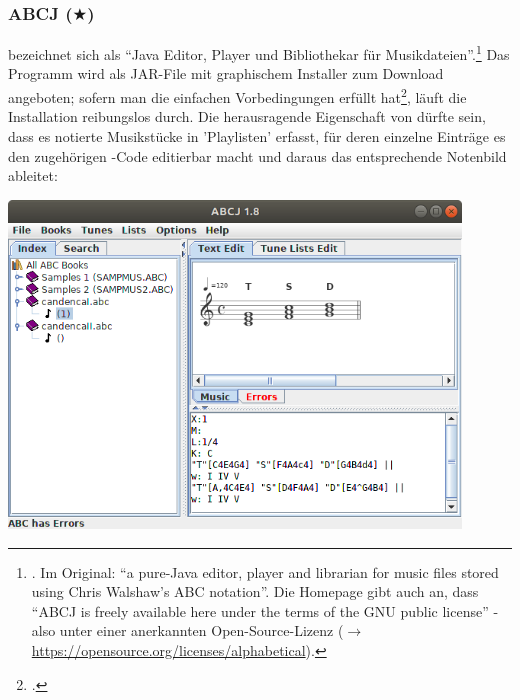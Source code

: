 %
%
%



\subsubsection{ABCJ ($\bigstar$)}

\label{ABCJ} bezeichnet sich als \enquote{Java Editor, Player und
Bibliothekar für Musikdateien}.\footnote{\cite[vgl.][\nopage wp]{Spencer2019a}.
Im Original: \enquote{a pure-Java editor, player and librarian for music files
stored using Chris Walshaw's ABC notation}. Die Homepage gibt auch an, dass
\enquote{ABCJ is freely available here under the terms of the GNU public
license} - also unter einer anerkannten Open-Source-Lizenz ($\rightarrow$
\href{https://opensource.org/licenses/alphabetical}
{https://opensource.org/licenses/alphabetical}).} Das Programm wird als JAR-File
mit graphischem Installer zum Download angeboten; sofern man die einfachen
Vorbedingungen erfüllt hat\footcite[vgl.][\nopage wp]{Spencer2019a}, läuft die
Installation reibungslos durch. Die herausragende Eigenschaft von 
dürfte sein, dass es  notierte Musikstücke in 'Playlisten' erfasst, für
deren einzelne Einträge es den zugehörigen -Code editierbar macht und
daraus  das entsprechende Notenbild ableitet:

\begin{center}
\includegraphics[width=0.9\textwidth]{frontends/abcj/abcj-cadenca1-300dpi.png}
\end{center}

